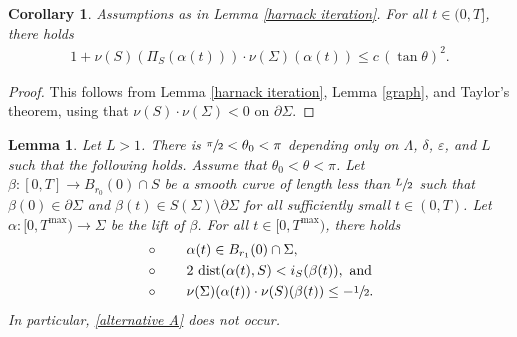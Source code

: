 \documentclass[11pt]{amsart}
\newtheorem{lem}[prop]{Lemma}
\newtheorem{coro}[prop]{Corollary}
\begin{document}
	\begin{coro} \label{normal coro}
	Assumptions as in Lemma \ref{harnack iteration}. For all $t\in(0,T]$, there holds
			\begin{align*} 
			1+\nu(S)(\Pi_S(\alpha(t)))\cdot \nu(\Sigma)(\alpha(t))\leq c\,(\tan\theta)^2.
		\end{align*} 
	\end{coro}
	\begin{proof}
	This follows from	Lemma \ref{harnack iteration}, Lemma \ref{graph},  and Taylor's theorem, using that $\nu(S)\cdot \nu(\Sigma)<0$ on $\partial \Sigma$.
		
	\end{proof}
	\begin{lem} \label{bounded length lift}
		Let   $L>1$.  There is $\sfrac{\pi}2<\theta_0<\pi$  depending only on $\Lambda$, $\delta$, $\varepsilon$, and $L$ such that the following holds. Assume that $\theta_0<\theta<\pi$. 		Let $\beta:[0, T]\to B_{r_0}(0)\cap S$ be a smooth curve of length less than $\sfrac{L}{2}$ such that $\beta(0)\in \partial \Sigma$ and $\beta(t)\in S(\Sigma)\setminus \partial \Sigma$ for all sufficiently small $t\in (0, T)$. Let $\alpha:[0, T^{\max})\to  \Sigma$  be the lift of $\beta$. For all $t\in[0,T^{\max})$, there holds 
		\begin{align*} 
			&\circ \qquad  \alpha(t)\in B_{r_1}(0)\cap \Sigma,
			\\&\circ \qquad 2\,\operatorname{dist}(\alpha(t),S)<i_S(\beta(t)),\text{ and}\\
			&\circ \qquad \nu(\Sigma)(\alpha(t))\cdot \nu(S)(\beta(t))\leq -\sfrac12.
		\end{align*} 
		 In particular, \eqref{alternative A} does not occur.
	\end{lem}
\end{document}
